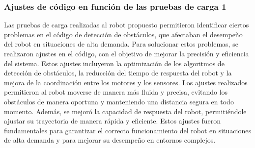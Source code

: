 \subsubsection{Ajustes de c\'odigo en funci\'on de las pruebas de carga 1} %
    \label{sub:Ajustes de c\'odigo en funci\'on de las pruebas de carga}
        Las pruebas de carga realizadas al robot propuesto permitieron identificar ciertos problemas en el c\'odigo de detecci\'on de obst\'aculos, 
            que afectaban el desempe\~no del robot en situaciones de alta demanda. Para solucionar estos problemas, se realizaron ajustes en el c\'odigo, 
            con el objetivo de mejorar la precisi\'on y eficiencia del sistema. Estos ajustes incluyeron la optimizaci\'on de los algoritmos de detecci\'on 
            de obst\'aculos, la reducci\'on del tiempo de respuesta del robot y la mejora de la coordinaci\'on entre los motores y los sensores. 
        \vskip 0.5cm
        Los ajustes realizados permitieron al robot moverse de manera m\'as fluida y precisa, evitando los obst\'aculos de manera oportuna y manteniendo 
            una distancia segura en todo momento. Adem\'as, se mejor\'o la capacidad de respuesta del robot, permiti\'endole ajustar su trayectoria 
            de manera r\'apida y eficiente. Estos ajustes fueron fundamentales para garantizar el correcto funcionamiento del robot en situaciones 
            de alta demanda y para mejorar su desempe\~no en entornos complejos.
